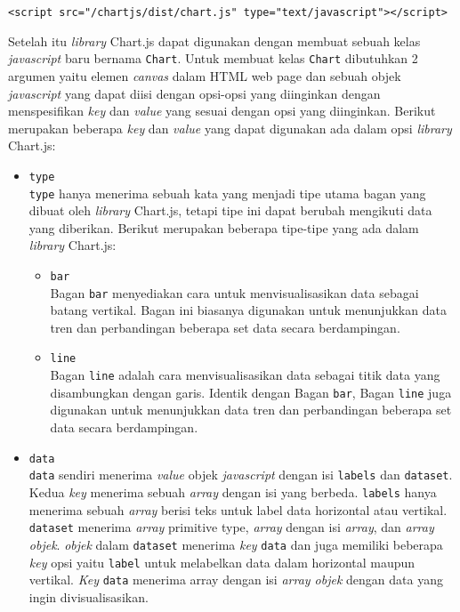 \begin{center}
	\verb|<script src="/chartjs/dist/chart.js" type="text/javascript"></script>|
\end{center}

Setelah itu \textit{library} Chart.js dapat digunakan dengan membuat sebuah kelas \textit{javascript} baru bernama \verb|Chart|. Untuk membuat kelas \verb|Chart| dibutuhkan 2 argumen yaitu elemen \textit{canvas} dalam HTML web page dan sebuah objek \textit{javascript} yang dapat diisi dengan opsi-opsi yang diinginkan dengan menspesifikan \textit{key} dan \textit{value} yang sesuai dengan opsi yang diinginkan. Berikut merupakan beberapa \textit{key} dan \textit{value} yang dapat digunakan ada dalam opsi \textit{library} Chart.js:

\begin{itemize}
	\item \verb|type| \\
	\verb|type| hanya menerima sebuah kata yang menjadi tipe utama bagan yang dibuat oleh \textit{library} Chart.js, tetapi tipe ini dapat berubah mengikuti data yang diberikan. Berikut merupakan beberapa tipe-tipe yang ada dalam \textit{library} Chart.js:
	\begin{itemize}
		\item \verb|bar| \\
		Bagan \verb|bar| menyediakan cara untuk menvisualisasikan data sebagai batang vertikal. Bagan ini biasanya digunakan untuk menunjukkan data tren dan perbandingan beberapa set data secara berdampingan.
		\item \verb|line| \\
		Bagan \verb|line| adalah cara menvisualisasikan data sebagai titik data yang disambungkan dengan garis. Identik dengan Bagan \verb|bar|, Bagan \verb|line| juga digunakan untuk menunjukkan data tren dan perbandingan beberapa set data secara berdampingan.
	\end{itemize}

	\item \verb|data| \\
	\verb|data| sendiri menerima \textit{value} objek \textit{javascript} dengan isi \verb|labels| dan \verb|dataset|. Kedua \textit{key} menerima sebuah \textit{array} dengan isi yang berbeda. \verb|labels| hanya menerima sebuah \textit{array} berisi teks untuk label data horizontal atau vertikal. \verb|dataset| menerima \textit{array} primitive type, \textit{array} dengan isi \textit{array}, dan \textit{array objek}. \textit{objek} dalam \verb|dataset| menerima \textit{key} \verb|data| dan juga memiliki beberapa \textit{key} opsi yaitu \verb|label| untuk melabelkan data dalam horizontal maupun vertikal. \textit{Key} \verb|data| menerima array dengan isi \textit{array objek} dengan data yang ingin divisualisasikan.


\end{itemize}
